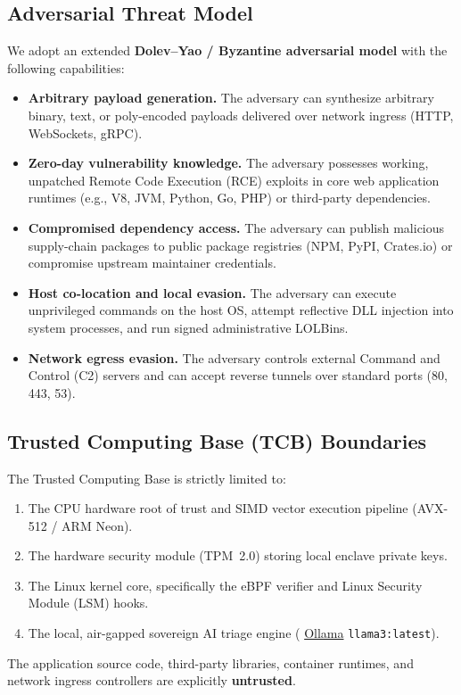 \documentclass{portalciencia}
\newcommand{\linkollama}{%
  \href{https://ollama.com}{Ollama}%
}
\theoremstyle{plain}
\theoremstyle{definition}
\begin{document}
\subsection{Adversarial Threat Model}

We adopt an extended \textbf{Dolev--Yao / Byzantine adversarial model} with the following capabilities:
\begin{itemize}
  \item \textbf{Arbitrary payload generation.} The adversary can synthesize arbitrary binary, text, or poly-encoded payloads delivered over network ingress (HTTP, WebSockets, gRPC).
  \item \textbf{Zero-day vulnerability knowledge.} The adversary possesses working, unpatched Remote Code Execution (RCE) exploits in core web application runtimes (e.g., V8, JVM, Python, Go, PHP) or third-party dependencies.
  \item \textbf{Compromised dependency access.} The adversary can publish malicious supply-chain packages to public package registries (NPM, PyPI, Crates.io) or compromise upstream maintainer credentials.
  \item \textbf{Host co-location and local evasion.} The adversary can execute unprivileged commands on the host OS, attempt reflective DLL injection into system processes, and run signed administrative LOLBins.
  \item \textbf{Network egress evasion.} The adversary controls external Command and Control (C2) servers and can accept reverse tunnels over standard ports (80, 443, 53).
\end{itemize}

\subsection{Trusted Computing Base (TCB) Boundaries}

The Trusted Computing Base is strictly limited to:
\begin{enumerate}
  \item The CPU hardware root of trust and SIMD vector execution pipeline (AVX-512 / ARM Neon).
  \item The hardware security module (TPM~2.0) storing local enclave private keys.
  \item The Linux kernel core, specifically the eBPF verifier and Linux Security Module (LSM) hooks.
  \item The local, air-gapped sovereign AI triage engine (\linkollama{} \texttt{llama3:latest}).
\end{enumerate}
The application source code, third-party libraries, container runtimes, and network ingress controllers are explicitly \textbf{untrusted}.
\end{document}
